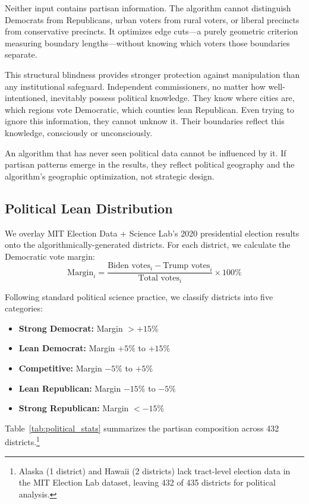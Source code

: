 Neither input contains partisan information. The algorithm cannot distinguish Democrats from Republicans, urban voters from rural voters, or liberal precincts from conservative precincts. It optimizes edge cuts—a purely geometric criterion measuring boundary lengths—without knowing which voters those boundaries separate.

This structural blindness provides stronger protection against manipulation than any institutional safeguard. Independent commissioners, no matter how well-intentioned, inevitably possess political knowledge. They know where cities are, which regions vote Democratic, which counties lean Republican. Even trying to ignore this information, they cannot unknow it. Their boundaries reflect this knowledge, consciously or unconsciously.

An algorithm that has never seen political data cannot be influenced by it. If partisan patterns emerge in the results, they reflect political geography and the algorithm's geographic optimization, not strategic design.

\subsection{Political Lean Distribution}

We overlay MIT Election Data + Science Lab's 2020 presidential election results \cite{medsl2020} onto the algorithmically-generated districts. For each district, we calculate the Democratic vote margin:
\[
\text{Margin}_i = \frac{\text{Biden votes}_i - \text{Trump votes}_i}{\text{Total votes}_i} \times 100\%
\]

Following standard political science practice, we classify districts into five categories:
\begin{itemize}
    \item \textbf{Strong Democrat:} Margin $> +15\%$
    \item \textbf{Lean Democrat:} Margin $+5\%$ to $+15\%$
    \item \textbf{Competitive:} Margin $-5\%$ to $+5\%$
    \item \textbf{Lean Republican:} Margin $-15\%$ to $-5\%$
    \item \textbf{Strong Republican:} Margin $< -15\%$
\end{itemize}

Table~\ref{tab:political_stats} summarizes the partisan composition across 432 districts.\footnote{Alaska (1 district) and Hawaii (2 districts) lack tract-level election data in the MIT Election Lab dataset, leaving 432 of 435 districts for political analysis.}

